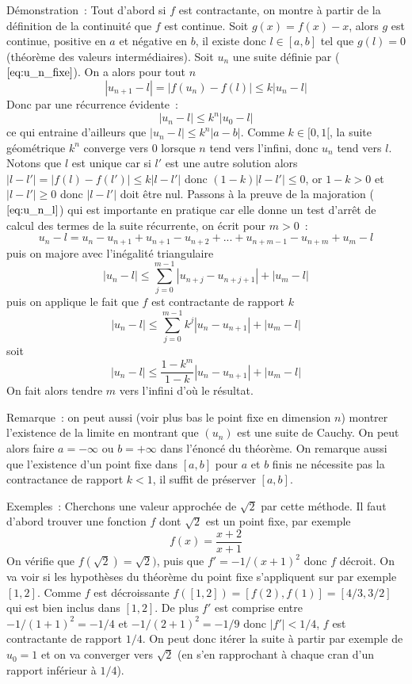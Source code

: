 \documentclass[a4paper,11pt]{book}
\begin{document}
\begin{giacjshere}
Démonstration~: Tout d'abord si $f$ est contractante, on montre à partir
de la définition de la continuité que $f$ est continue. 
Soit $g(x)=f(x)-x$, alors $g$ est continue, positive en $a$ et négative
en $b$, il existe donc $l\in[a,b]$ tel que $g(l)=0$ (théorème des
valeurs intermédiaires). 
Soit $u_n$ une suite définie par
(\(\ref{eq:u_n_fixe}\)). On a alors pour tout $n$
\[ |u_{n+1}-l|=|f(u_n)-f(l)| \leq k |u_n-l| \]
Donc par une récurrence évidente~:
\[ |u_n-l| \leq k^n |u_0-l| \]
ce qui entraine d'ailleurs que $|u_n-l| \leq k^n |a-b|$.
Comme $k \in [0,1[ $, la suite géométrique $k^n$ converge vers 0
lorsque $n$ tend vers l'infini, donc $u_n$ tend vers $l$.
Notons que $l$ est unique car si $l'$ est une autre solution
alors $|l-l'|=|f(l)-f(l')| \leq k|l-l'|$ donc $(1-k)|l-l'| \leq 0$,
or $1-k>0$ et $|l-l'| \geq 0$ donc $|l-l'|$ doit \^etre nul.
Passons à la preuve de la majoration (\(\ref{eq:u_n_l}\)) qui est importante
en pratique car elle donne un test d'arrêt de calcul des
termes de la suite récurrente, on écrit pour $m>0$~:
\[ u_n-l= u_n - u_{n+1} + u_{n+1} - u_{n+2} + ... + u_{n+m-1}- u_{n+m}
+ u_m-l \]
puis on majore avec l'inégalité triangulaire
\[ |u_n-l| \leq \sum_{j=0}^{m-1} |u_{n+j}-u_{n+j+1}| + |u_m-l| \]
puis on applique le fait que $f$ est contractante de rapport $k$
\[ |u_n-l| \leq \sum_{j=0}^{m-1} k^j |u_{n}-u_{n+1}| + |u_m-l| \]
soit
\[ |u_n-l| \leq \frac{1-k^m}{1-k} |u_{n}-u_{n+1}| + |u_m-l| \]
On fait alors tendre $m$ vers l'infini d'où le résultat.

Remarque~: on peut aussi (voir plus bas le point fixe en dimension
$n$) montrer l'existence de la limite en montrant que $(u_n)$ est
une suite de Cauchy. On peut alors faire $a=-\infty$ ou $b=+\infty$
dans l'\'enonc\'e du th\'eor\`eme. On remarque aussi 
que l'existence d'un point fixe
dans $[a,b]$ pour $a$ et $b$ finis ne n\'ecessite pas la contractance
de rapport $k<1$, il suffit de pr\'eserver $[a,b]$.

Exemples~: 
Cherchons une valeur approchée de $\sqrt{2}$ par cette méthode.
Il faut d'abord trouver une fonction $f$ dont $\sqrt{2}$ est un point
fixe, par exemple
\[ f(x)=\frac{x+2}{x+1}\]
On vérifie que $f(\sqrt{2})=\sqrt{2})$, puis que $f'=-1/(x+1)^2$
donc $f$ décroit. On va voir si les hypothèses du théorème du point
fixe s'appliquent sur par exemple $[1,2]$. Comme $f$ est décroissante
$f([1,2])=[f(2),f(1)]=[4/3,3/2]$ qui est bien inclus dans $[1,2] $.
De plus $f'$ est comprise entre $-1/(1+1)^2=-1/4$ et $-1/(2+1)^2=-1/9$ donc
$|f'|<1/4$, $f$ est contractante de rapport $1/4$. On peut donc
itérer la suite à partir par exemple de $u_0=1$ et on va converger
vers $\sqrt{2}$ (en s'en rapprochant à chaque cran d'un rapport
inférieur à $1/4$).


\end{giacjshere}
\end{document}
